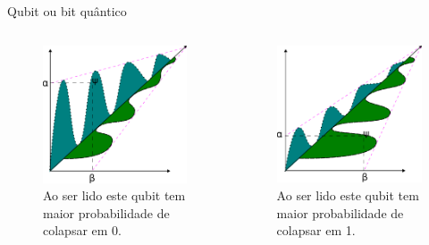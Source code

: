 \begin{frame}[allowframebreaks]{Qubit ou bit quântico}
		\begin{columns}
			\begin{column}{.5\linewidth}
				\begin{figure}
					\centering
					\includegraphics[width=0.5\linewidth]{../text/images/photonState02}
					\caption{Ao ser lido este qubit tem maior probabilidade de colapsar em 0.}
					\label{fig:photonstate02}
				\end{figure}
			\end{column}
			\begin{column}{.5\linewidth}
				\begin{figure}
					\centering
					\includegraphics[width=0.5\linewidth]{../text/images/photonState03}
					\caption{Ao ser lido este qubit tem maior probabilidade de colapsar em 1.}
					\label{fig:photonstate03}
				\end{figure}
			\end{column}
		\end{columns}
		

\end{frame}
